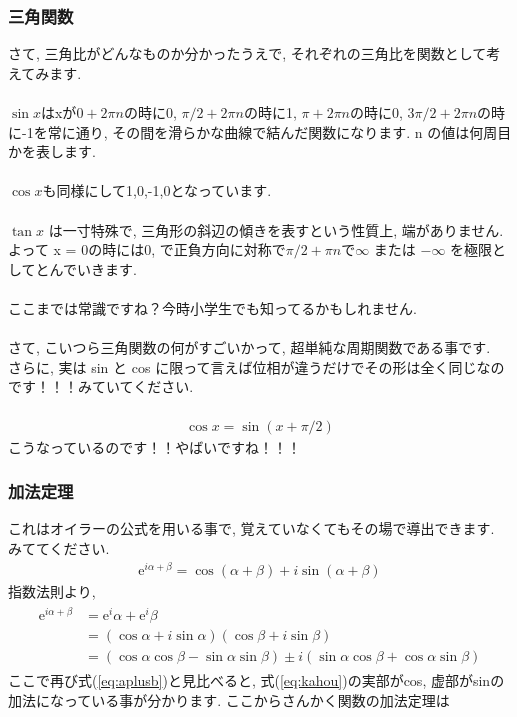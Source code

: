 \documentclass[11pt,a4paper]{jsarticle}
\begin{document}
\subsubsection{三角関数}
さて, 三角比がどんなものか分かったうえで, それぞれの三角比を関数として考えてみます.\\
\\
 $\sin x $はxが$0 + 2\pi n$の時に0, $\pi/2 + 2\pi n$の時に1, $\pi + 2\pi n$の時に0, $3\pi/2 + 2\pi n$の時に-1を常に通り, その間を滑らかな曲線で結んだ関数になります. n の値は何周目かを表します.\\
\\
$\cos x $も同様にして1,0,-1,0となっています. \\
\\
$\tan x$ は一寸特殊で, 三角形の斜辺の傾きを表すという性質上, 端がありません. よって x = 0の時には0, で正負方向に対称で$\pi/2 + \pi n$で$\infty$ または $-\infty$ を極限としてとんでいきます.\\
\\
ここまでは常識ですね？今時小学生でも知ってるかもしれません.\\
\\
さて, こいつら三角関数の何がすごいかって, 超単純な周期関数である事です. \\
さらに, 実は sin と cos に限って言えば位相が違うだけでその形は全く同じなのです！！！みていてください.\\
\\
\begin{eqnarray}
\cos x = \sin (x + \pi/2)
\end{eqnarray}
こうなっているのです！！やばいですね！！！
\\

\subsubsection{加法定理}
これはオイラーの公式を用いる事で, 覚えていなくてもその場で導出できます. みててください.
\begin{eqnarray}
\mathrm{e}^{i{\alpha + \beta}} = \cos (\alpha + \beta) + i\sin (\alpha + \beta)
\label{eq:aplusb}
\end{eqnarray}
指数法則より,
\begin{eqnarray}
\begin{split}
\mathrm{e}^{i{\alpha + \beta}} &= \mathrm{e}^i\alpha + \mathrm{e}^i\beta \\ &= (\cos \alpha + i\sin\alpha)(\cos\beta + i\sin\beta) \\
&= (\cos\alpha\cos\beta - \sin\alpha\sin\beta)\pm i(\sin\alpha\cos\beta + \cos\alpha\sin\beta)
\end{split}
\label{eq:kahou}
\end{eqnarray}
ここで再び式(\ref{eq:aplusb})と見比べると, 式(\ref{eq:kahou})の実部がcos, 虚部がsinの加法になっている事が分かります. ここからさんかく関数の加法定理は
\end{document}
